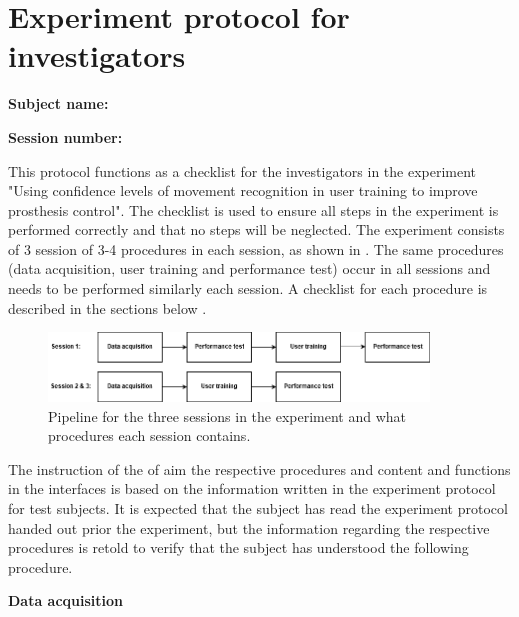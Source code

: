 
\section{Experiment protocol for investigators} \label{sec:protocol:investigator}

\textbf{Subject name:} 

\textbf{Session number:}

This protocol functions as a checklist for the investigators in the experiment "Using confidence levels of movement recognition in user training to improve prosthesis control". The checklist is used to ensure all steps in the experiment is performed correctly and that no steps will be neglected. The experiment consists of 3 session of 3-4 procedures in each session, as shown in . The same procedures (data acquisition, user training and performance test) occur in all sessions and needs to be performed similarly each session. A checklist for each procedure is described in the sections below .

\begin{figure}[H]                                         
	\includegraphics[width=0.9\textwidth]{figures/pMethods/experiment_protocol_pipeline}  
	\caption{Pipeline for the three sessions in the experiment and what procedures each session contains.}
	\label{fig:experiment_protocol_pipeline_investigators} 
\end{figure} 

The instruction of the of aim the respective procedures and content and functions in the interfaces is based on the information written in the experiment protocol for test subjects. It is expected that the subject has read the experiment protocol handed out prior the experiment, but the information regarding the respective procedures is retold to verify that the subject has understood the following procedure.

\textbf{\large Data acquisition}

